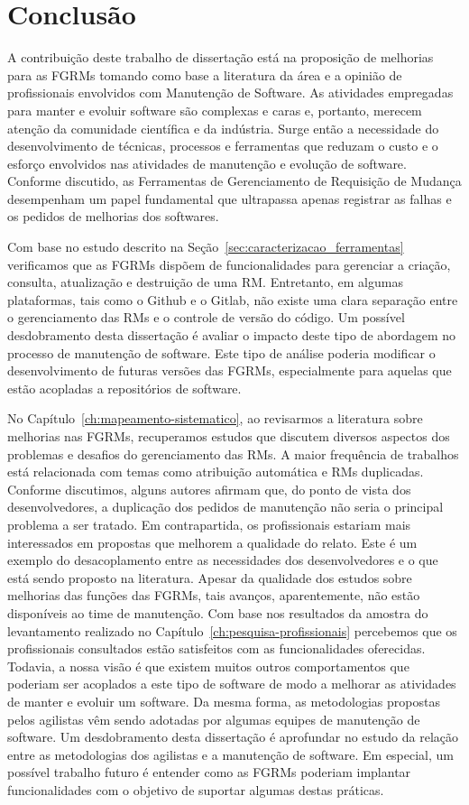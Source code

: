 \chapter{Conclusão}
\label{ch:conclusao_trab_futuros}

A contribuição deste trabalho de dissertação está na proposição de melhorias
para as FGRMs tomando como base a literatura da área e a opinião de
profissionais envolvidos com Manutenção de Software. As atividades empregadas
para manter e evoluir software são complexas e caras e, portanto, merecem
atenção da comunidade científica e da indústria. Surge então a necessidade do
desenvolvimento de técnicas, processos e ferramentas que reduzam o custo e o
esforço envolvidos nas atividades de manutenção e evolução de software.
Conforme discutido, as Ferramentas de Gerenciamento de Requisição de Mudança
desempenham um papel fundamental que ultrapassa apenas registrar as falhas e os
pedidos de melhorias dos softwares.

Com base no estudo descrito na Seção~\ref{sec:caracterizacao_ferramentas}
verificamos que as FGRMs dispõem de funcionalidades para gerenciar a criação,
consulta, atualização e destruição de uma RM\@. Entretanto, em algumas
plataformas, tais como o Github e o Gitlab, não existe uma clara separação
entre o gerenciamento das RMs e o controle de versão do código. Um possível
desdobramento desta dissertação é avaliar o impacto deste tipo de abordagem no
processo de manutenção de software. Este tipo de análise poderia modificar o
desenvolvimento de futuras versões das FGRMs, especialmente para aquelas que
estão acopladas a repositórios de software.

No Capítulo~\ref{ch:mapeamento-sistematico}, ao revisarmos a literatura sobre
melhorias nas FGRMs, recuperamos estudos que discutem diversos aspectos dos
problemas e desafios do gerenciamento das RMs. A maior frequência de trabalhos
está relacionada com temas como atribuição automática e RMs duplicadas.
Conforme discutimos, alguns autores afirmam que, do ponto de vista dos
desenvolvedores, a duplicação dos pedidos de manutenção não seria o principal
problema a ser tratado. Em contrapartida, os profissionais estariam mais
interessados em propostas que melhorem a qualidade do relato. Este é um exemplo
do desacoplamento entre as necessidades dos desenvolvedores e o que está sendo
proposto na literatura. Apesar da qualidade dos estudos sobre melhorias das
funções das FGRMs, tais avanços, aparentemente, não estão disponíveis ao time
de manutenção. Com base nos resultados da amostra do levantamento realizado no
Capítulo~\ref{ch:pesquisa-profissionais} percebemos que os profissionais
consultados estão satisfeitos com as funcionalidades oferecidas. Todavia, a
nossa visão é que existem muitos outros comportamentos que poderiam ser
acoplados a este tipo de software de modo a melhorar as atividades de manter e
evoluir um software. Da mesma forma, as metodologias propostas pelos agilistas
vêm sendo adotadas por algumas equipes de manutenção de software. Um
desdobramento desta dissertação é aprofundar no estudo da relação entre as
metodologias dos agilistas e a manutenção de software. Em especial, um possível
trabalho futuro é entender como as FGRMs poderiam implantar funcionalidades com
o objetivo de suportar algumas destas práticas.

